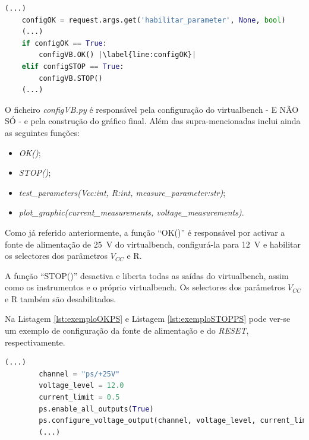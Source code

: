 \begin{minipage}{0.9\linewidth}
	\begin{lstlisting}[language=python, escapechar=|, caption=Teste do parâmetro ``OK'' (\ldots e ``STOP'') no ficheiro \textit{views.py}, label=lst:recepcaoparametros]
	(...)
	configOK = request.args.get('habilitar_parameter', None, bool)
	(...)
	if configOK == True:
        configVB.OK() |\label{line:configOK}|  
    elif configSTOP == True:
        configVB.STOP()	
	(...)
	\end{lstlisting}
\end{minipage}

O ficheiro \textit{configVB.py} é responsável pela configuração do \acrshort{virtualbench} - E NÃO SÓ - e pela construção do gráfico final. Além das supra-mencionadas inclui ainda as seguintes funções:
\begin{itemize}
	\item \textit{OK()};
	\item \textit{STOP()};
	\item \textit{test\_parameters(Vcc:int, R:int, measure\_parameter:str)};
	\item \textit{plot\_graphic(current\_measurements, voltage\_measurements)}.
\end{itemize}

Como já referido anteriormente, a função ``OK()'' é responsável por activar a fonte de alimentação de \SI{25}{\volt} do \acrshort{virtualbench}, configurá-la para \SI{12}{\volt} e habilitar os selectores dos parâmetros $V_{CC}$ e R. 


A função ``STOP()'' desactiva e liberta todas as saídas do \acrshort{virtualbench}, assim como os instrumentos e o próprio \acrshort{virtualbench}. Os selectores dos parâmetros $V_{CC}$ e R também são desabilitados.

Na Listagem \ref{lst:exemploOKPS} e Listagem \ref{lst:exemploSTOPPS} pode ver-se um exemplo de configuração da fonte de alimentação e do \textit{RESET}, respectivamente. 

\begin{minipage}{0.9\linewidth}
	\begin{lstlisting}[language=python, escapechar=|, caption=Exemplo de configuração: fonte de alimentação - OK, label=lst:exemploOKPS]
		(...)
		channel = "ps/+25V"
		voltage_level = 12.0
		current_limit = 0.5 
		ps.enable_all_outputs(True)
		ps.configure_voltage_output(channel, voltage_level, current_limit)
		(...)
	\end{lstlisting}
\end{minipage}


